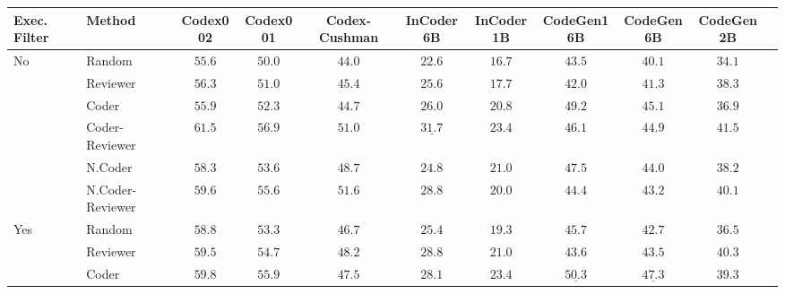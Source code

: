 \documentclass[nohyperref]{article}
\theoremstyle{plain}
\theoremstyle{definition}
\theoremstyle{remark}
\begin{document}
\begin{table*}[]
\setlength{\tabcolsep}{1.5pt}
\footnotesize
\centering
\begin{tabular}{l|lccccccccc}
\toprule
    Exec. Filter & Method &            Codex002 &            Codex001 &       Codex-Cushman &           InCoder6B &           InCoder1B &          CodeGen16B &           CodeGen6B &           CodeGen2B \\
\midrule
\multirow{6}{*}{No} & Random &              $55.6$ &              $50.0$ &              $44.0$ &              $22.6$ &              $16.7$ &              $43.5$ &              $40.1$ &              $34.1$ \\
    & Reviewer &              $56.3$ &              $51.0$ &              $45.4$ &              $25.6$ &              $17.7$ &              $42.0$ &              $41.3$ &              $38.3$ \\
\cmidrule{2-10}
    & Coder &              $55.9$ &              $52.3$ &              $44.7$ &              $26.0$ &              $20.8$ &              $49.2$ &              $45.1$ &              $36.9$ \\
    & Coder-Reviewer &              $61.5$ &              $56.9$ &              $51.0$ &  $\underline{31.7}$ &              $23.4$ &              $46.1$ &              $44.9$ &              $41.5$ \\
\cmidrule{2-10}
    & N.Coder &              $58.3$ &              $53.6$ &              $48.7$ &              $24.8$ &              $21.0$ &              $47.5$ &              $44.0$ &              $38.2$ \\
    & N.Coder-Reviewer &              $59.6$ &              $55.6$ &              $51.6$ &              $28.8$ &              $20.0$ &              $44.4$ &              $43.2$ &              $40.1$ \\
\midrule
\multirow{7}{*}{Yes} & Random &              $58.8$ &              $53.3$ &              $46.7$ &              $25.4$ &              $19.3$ &              $45.7$ &              $42.7$ &              $36.5$ \\
    & Reviewer &              $59.5$ &              $54.7$ &              $48.2$ &              $28.8$ &              $21.0$ &              $43.6$ &              $43.5$ &              $40.3$ \\
\cmidrule{2-10}
    & Coder &              $59.8$ &              $55.9$ &              $47.5$ &              $28.1$ &              $23.4$ &  $\underline{50.3}$ &  $\underline{47.3}$ &              $39.3$ \\

\end{tabular}
\end{table*}
\end{document}
